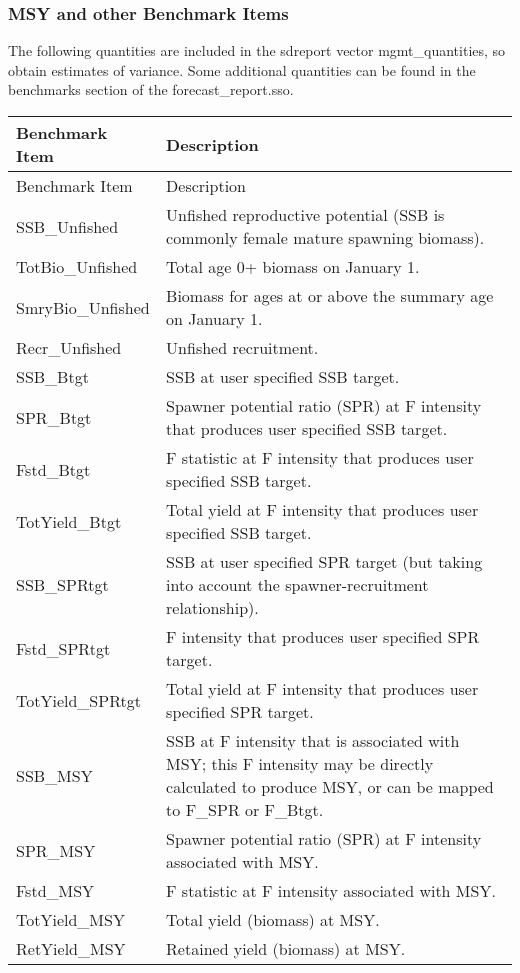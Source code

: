 \subsubsection{MSY and other Benchmark Items}
The following quantities are included in the sdreport vector mgmt\_quantities, so obtain estimates of variance.  Some additional quantities can be found in the benchmarks section of the forecast\_report.sso.

\begin{center}
	\begin{longtable}{p{4cm} p{11cm}}
		\hline
		Benchmark Item & Description \Tstrut\Bstrut\\
		\hline
		\endfirsthead

		\hline
		Benchmark Item & Description \Tstrut\Bstrut\\
		\hline
		\endhead
		
		\endfoot
		\hline		
		\endlastfoot
		
		SSB\_Unfished \Tstrut & Unfished reproductive potential (SSB is commonly female mature spawning biomass). \\
		TotBio\_Unfished \Tstrut & Total age 0+ biomass on January 1. \\
		SmryBio\_Unfished \Tstrut & Biomass for ages at or above the summary age on January 1. \\
		Recr\_Unfished \Tstrut & Unfished recruitment. \\
		SSB\_Btgt \Tstrut & SSB at user specified SSB target. \\
		SPR\_Btgt \Tstrut & Spawner potential ratio (SPR) at F intensity that produces user specified SSB target. \\
		Fstd\_Btgt \Tstrut & F statistic at F intensity that produces user specified SSB target. \\
		TotYield\_Btgt \Tstrut & Total yield at F intensity that produces user specified SSB target. \\
		SSB\_SPRtgt \Tstrut & SSB at user specified SPR target (but taking into account the spawner-recruitment relationship). \\
		Fstd\_SPRtgt \Tstrut & F intensity that produces user specified SPR target. \\
		TotYield\_SPRtgt \Tstrut & Total yield at F intensity that produces user specified SPR target. \\
		SSB\_MSY \Tstrut & SSB at F intensity that is associated with MSY; this F intensity may be directly calculated to produce MSY, or can be mapped to F\_SPR or F\_Btgt. \\
		SPR\_MSY \Tstrut & Spawner potential ratio (SPR) at F intensity associated with MSY. \\
		Fstd\_MSY \Tstrut & F statistic at F intensity associated with MSY. \\
		TotYield\_MSY \Tstrut & Total yield (biomass) at MSY. \\
		RetYield\_MSY \Tstrut & Retained yield (biomass) at MSY. \Bstrut\\ 
	\end{longtable}
\end{center}

